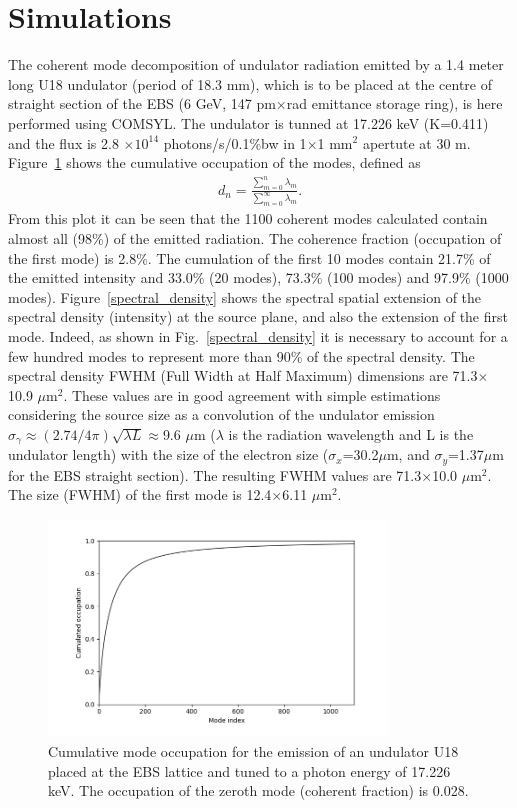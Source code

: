 \documentclass{iucr}              %
\newcommand{\inblue}[1]{{\color{blue}#1}}
\begin{document}
\section{Simulations}

The coherent mode decomposition of undulator radiation emitted by a 1.4 meter long U18 undulator (period of 18.3 mm), which is to be placed at the centre of straight section of the EBS (6 GeV, 147 pm$\times$rad emittance storage ring), is here performed using COMSYL. The undulator is tunned at 17.226 keV (K=0.411) and the flux is 2.8 $\times 10^{14}$ photons/s/0.1\%bw in 1$\times$1 mm$^2$ apertute at 30 m. \inblue{Figure~\ref{cumulative_mode_occupation}} shows the cumulative occupation of the modes, defined as
\begin{equation}
\begin{aligned}
\label{spectrum}
d_n=\frac{\sum_{m=0}^{n} \lambda_m}{\sum_{m=0}^{\infty} \lambda_m}.
\end{aligned}
\end{equation}
From this plot it can be seen that the 1100 coherent modes calculated contain almost all (98\%) of the emitted radiation. The coherence fraction (occupation of the first mode) is 2.8\%. The cumulation of the first 10 modes contain 21.7\% of the emitted intensity and 33.0\% (20 modes), 73.3\% (100 modes) and 97.9\% (1000 modes). 
\inblue{Figure~\ref{spectral_density}} shows the spectral spatial extension of the spectral density (intensity) at the source plane, and also the extension of the first mode.
Indeed, as shown in \inblue{Fig.~\ref{spectral_density}} it is necessary to account for a few hundred modes to represent more than 90\% of the spectral density. The spectral density FWHM (Full Width at Half Maximum) dimensions are 71.3$\times$10.9 $\mu$m$^2$. These values are in good agreement with simple estimations considering the source size as a convolution of the undulator emission $\sigma_\gamma\approx (2.74/4\pi) \sqrt{\lambda L}\approx$9.6 $\mu$m ($\lambda$ is the radiation wavelength and L is the undulator length) with the size of the electron size ($\sigma_x$=30.2$\mu$m, and $\sigma_y$=1.37$\mu$m for the EBS straight section). The resulting FWHM values are 71.3$\times$10.0 $\mu$m$^2$. The size (FWHM) of the first mode is 12.4$\times$6.11 $\mu$m$^2$.  

\begin{figure}\label{cumulative_mode_occupation}
\caption{Cumulative mode occupation for the emission of an undulator U18 placed at the EBS lattice and tuned to a photon energy of 17.226 keV. The occupation of the zeroth mode (coherent fraction) is 0.028.}
\includegraphics[width=9.0cm]{Figures/vx_cumulated.png}
\end{figure}
\end{document}
